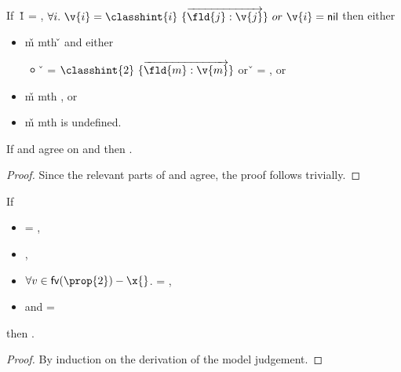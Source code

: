 \begin{assumption}[\invokejavamethodliteral] \label{assumption:method}
  If\ {\v{1}} = {},
  $\forall i.\ {\v{i}}={\classvalue{\classhint{i}}{\overrightarrow{\classfieldpair{\fld{j}} {\v{j}}}}}\ or\ {\v{i}}={\nil}$
         then either
         \begin{itemize}
           \item
   {\v{m}} {mth}
                    {} {}
                    {}
                    {\v{}}
                  and either
                  \begin{itemize}
                    \item
                  \v{} = ${\classvalue{\classhint{2}}{\overrightarrow{\classfieldpair{\fld{m}} {\v{m}}}}}$
                  or\ 
                  \v{} = \nil, or
                  \end{itemize}
          \item
   {\v{m}} {mth}
                    {} {}
                    {\classhint{2}}
                    {}, or
          \item 
   {\v{m}} {mth}
                    {} {}
                    {\classhint{2}}
                    is undefined.
        \end{itemize}
\end{assumption}

\begin{lemma} \label{lemma:envagree}
  If \openv{} and \openvp{} agree on \fv{\prop{}}
  and \satisfies{\openv{}}{\prop{}}
  then \satisfies{\openvp{}}{\prop{}}.
\begin{proof}
  Since the relevant parts of \openv{} and \openvp{} agree, the proof follows trivially.
\end{proof}
\end{lemma}

\begin{lemma} \label{lemma:substfilter}
  If 
  \begin{itemize}
    \item {} = { {\object{}} {\x{}}},
    \item
  {},
    \item
  $\forall v \in \fv{\prop{2}} - \x{}$.
                              {} = {},
    \item
  and {} = {}
  \end{itemize}
  then .

  \begin{proof}
    By induction on the derivation of the model judgement.
  \end{proof}
\end{lemma}

